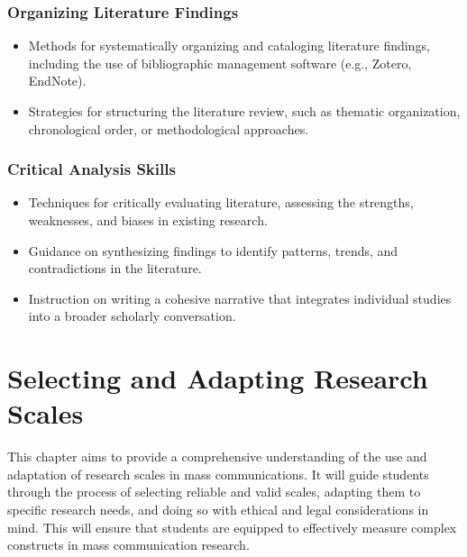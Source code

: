 \documentclass[
]{book}
\begin{document}
\hypertarget{organizing-literature-findings}{%
\subsection*{Organizing Literature Findings}\label{organizing-literature-findings}}

\begin{itemize}
\item
  Methods for systematically organizing and cataloging literature findings, including the use of bibliographic management software (e.g., Zotero, EndNote).
\item
  Strategies for structuring the literature review, such as thematic organization, chronological order, or methodological approaches.
\end{itemize}

\hypertarget{critical-analysis-skills}{%
\subsection*{Critical Analysis Skills}\label{critical-analysis-skills}}

\begin{itemize}
\item
  Techniques for critically evaluating literature, assessing the strengths, weaknesses, and biases in existing research.
\item
  Guidance on synthesizing findings to identify patterns, trends, and contradictions in the literature.
\item
  Instruction on writing a cohesive narrative that integrates individual studies into a broader scholarly conversation.
\end{itemize}

\hypertarget{selecting-and-adapting-research-scales}{%
\chapter*{Selecting and Adapting Research Scales}\label{selecting-and-adapting-research-scales}}

This chapter aims to provide a comprehensive understanding of the use and adaptation of research scales in mass communications. It will guide students through the process of selecting reliable and valid scales, adapting them to specific research needs, and doing so with ethical and legal considerations in mind. This will ensure that students are equipped to effectively measure complex constructs in mass communication research.
\end{document}
